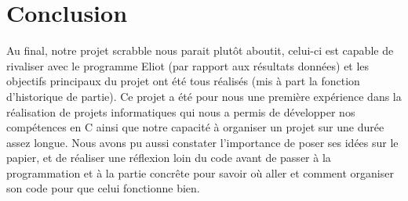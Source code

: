 \documentclass[a4paper,8pt,french,fleqn]{article}
\begin{document}
\section{Conclusion}

Au final, notre projet scrabble nous parait plutôt aboutit, celui-ci est capable de rivaliser avec le programme Eliot (par rapport aux résultats données) et les objectifs principaux du projet ont été tous réalisés (mis à part la fonction d'historique de partie). Ce projet a été pour nous une première expérience dans la réalisation de projets informatiques qui nous a permis de développer nos compétences en C ainsi que notre capacité à organiser un projet sur une durée assez longue. Nous avons pu aussi constater l'importance de poser ses idées sur le papier, et de réaliser une réflexion loin du code avant de passer à la programmation et à la partie concrête pour savoir où aller et comment organiser son code pour que celui fonctionne bien. 
\end{document}
